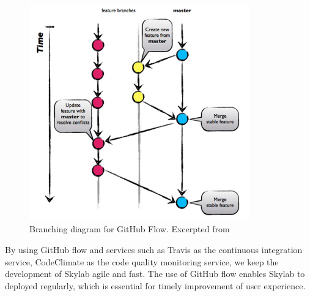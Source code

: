 \begin{figure}[h]
  \centering
  \includegraphics[width=0.85\textwidth]{Images/Github_Flow_Branching_Model.png}
  \caption{Branching diagram for GitHub Flow. Excerpted from \cite{citation8}}
  \label{fig:GithubFlow}
\end{figure}

By using GitHub flow and services such as Travis as the continuous integration service\cite{citationtravis}, CodeClimate as the code quality monitoring service\cite{citationcodeclimate}, we keep the development of Skylab agile and fast. The use of GitHub flow enables Skylab to deployed regularly, which is essential for timely improvement of user experience\cite{citation9}.
